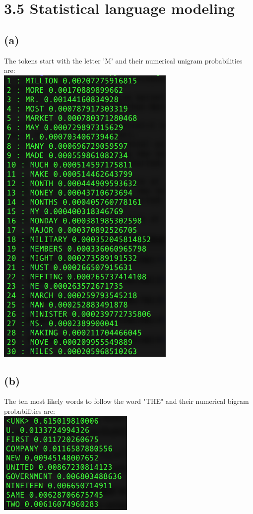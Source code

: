 \documentclass [11pt, a4paper, oneside] {article}
\begin{document}
\section *{3.5 Statistical language modeling}
\subsection *{(a)}
The tokens start with the letter 'M' and their numerical unigram probabilities are:\\
\includegraphics[height=15cm]{35a.png}
\subsection *{(b)}
The ten most likely words to follow the word "THE" and their numerical bigram probabilities are:\\
\includegraphics[height=5cm]{35b.png}
\end{document}
